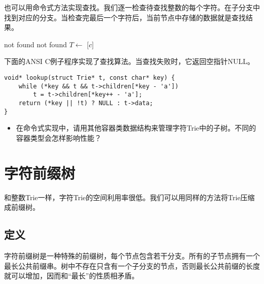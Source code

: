 \documentclass[UTF8]{article}
\begin{document}
也可以用命令式方法实现查找。我们逐一检查待查找整数的每个字符。在子分支中找到对应的分支。当检查完最后一个字符后，当前节点中存储的数据就是查找结果。

\begin{algorithmic}[1]
    \State \Return not found
  \EndIf
      \State \Return not found
    \EndIf
    \State $T \gets $ [$c$]
  \EndFor
  \State \Return {}
\EndFunction
\end{algorithmic}

下面的ANSI C例子程序实现了查找算法。当查找失败时，它返回空指针NULL。

\lstset{language=C}
\begin{lstlisting}
void* lookup(struct Trie* t, const char* key) {
    while (*key && t && t->children[*key - 'a'])
        t = t->children[*key++ - 'a'];
    return (*key || !t) ? NULL : t->data;
}
\end{lstlisting}


\begin{Exercise}
\begin{itemize}
\item 在命令式实现中，请用其他容器类数据结构来管理字符Trie中的子树。不同的容器类型会怎样影响性能？
\end{itemize}
\end{Exercise}

\section{字符前缀树}

和整数Trie一样，字符Trie的空间利用率很低。我们可以用同样的方法将Trie压缩成前缀树。

\subsection{定义}

字符前缀树是一种特殊的前缀树，每个节点包含若干分支。所有的子节点拥有一个最长公共前缀串。树中不存在只含有一个子分支的节点，否则最长公共前缀的长度就可以增加，因而和“最长”的性质相矛盾。
\end{document}

